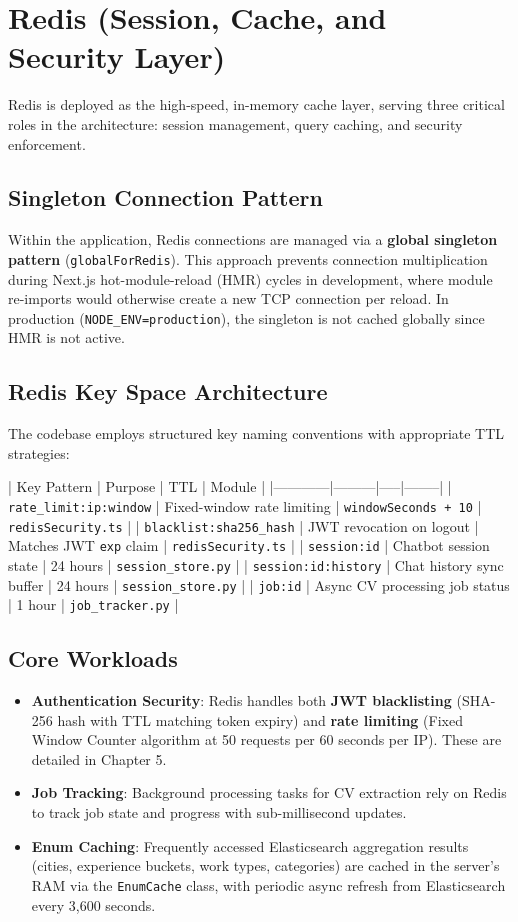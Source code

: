 \section{Redis (Session, Cache, and Security Layer)}

Redis is deployed as the high-speed, in-memory cache layer, serving three critical roles in the architecture: session management, query caching, and security enforcement.

\subsection{Singleton Connection Pattern}
Within the application, Redis connections are managed via a \textbf{global singleton pattern} (\texttt{globalForRedis}). This approach prevents connection multiplication during Next.js hot-module-reload (HMR) cycles in development, where module re-imports would otherwise create a new TCP connection per reload. In production (\texttt{NODE\_ENV=production}), the singleton is not cached globally since HMR is not active.

\subsection{Redis Key Space Architecture}

The codebase employs structured key naming conventions with appropriate TTL strategies:

| Key Pattern | Purpose | TTL | Module |
|------------|---------|-----|--------|
| \texttt{rate\_limit:{ip}:{window}} | Fixed-window rate limiting | \texttt{windowSeconds + 10} | \texttt{redisSecurity.ts} |
| \texttt{blacklist:{sha256\_hash}} | JWT revocation on logout | Matches JWT \texttt{exp} claim | \texttt{redisSecurity.ts} |
| \texttt{session:{id}} | Chatbot session state | 24 hours | \texttt{session\_store.py} |
| \texttt{session:{id}:history} | Chat history sync buffer | 24 hours | \texttt{session\_store.py} |
| \texttt{job:{id}} | Async CV processing job status | 1 hour | \texttt{job\_tracker.py} |

\subsection{Core Workloads}
\begin{itemize}
\item \textbf{Authentication Security}: Redis handles both \textbf{JWT blacklisting} (SHA-256 hash with TTL matching token expiry) and \textbf{rate limiting} (Fixed Window Counter algorithm at 50 requests per 60 seconds per IP). These are detailed in Chapter 5.
\item \textbf{Job Tracking}: Background processing tasks for CV extraction rely on Redis to track job state and progress with sub-millisecond updates.
\item \textbf{Enum Caching}: Frequently accessed Elasticsearch aggregation results (cities, experience buckets, work types, categories) are cached in the server's RAM via the \texttt{EnumCache} class, with periodic async refresh from Elasticsearch every 3,600 seconds.
\end{itemize}

